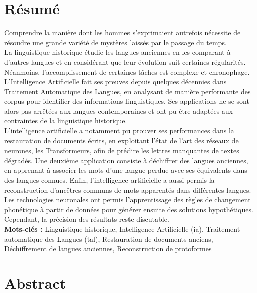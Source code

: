 \documentclass[12pt, twoside]{report}
\begin{document}
\null
\setcounter{page}{1}
\thispagestyle{empty}
\newpage %
\section*{Résumé}
Comprendre la manière dont les hommes s’exprimaient autrefois nécessite de résoudre une grande variété de mystères laissés par le passage du temps.\\ 

La linguistique historique étudie les langues anciennes en les comparant à d’autres langues et en considérant que leur évolution suit certaines régularités. Néanmoins, l’accomplissement de certaines tâches est complexe et chronophage.\\
\indent L’Intelligence Artificielle fait ses preuves depuis quelques décennies dans Traitement Automatique des Langues, en analysant de manière performante des corpus pour identifier des informations linguistiques. Ses applications ne se sont alors pas arrêtées aux langues contemporaines et ont pu être adaptées aux contraintes de la linguistique historique.\\
\indent L’intelligence artificielle a notamment pu prouver ses performances dans la restauration de documents écrits, en exploitant l’état de l’art des réseaux de neurones, les Transformeurs, afin de prédire les lettres manquantes de textes dégradés. Une deuxième application consiste à déchiffrer des langues anciennes, en apprenant à associer les mots d’une langue perdue avec ses équivalents dans des langues connues. Enfin, l’intelligence artificielle a aussi permis la reconstruction d’ancêtres communs de mots apparentés dans différentes langues. Les technologies neuronales ont permis l’apprentissage des règles de changement phonétique à partir de données pour générer ensuite des solutions hypothétiques. Cependant, la précision des résultats reste discutable.\\

\textbf{Mots-clés :} Linguistique historique, Intelligence Artificielle (\Gls{ia}), Traitement automatique des Langues (\Gls{tal}), Restauration de documents anciens, Déchiffrement de langues anciennes, Reconstruction de \glspl{protoforme}

\section*{Abstract}
\end{document}
